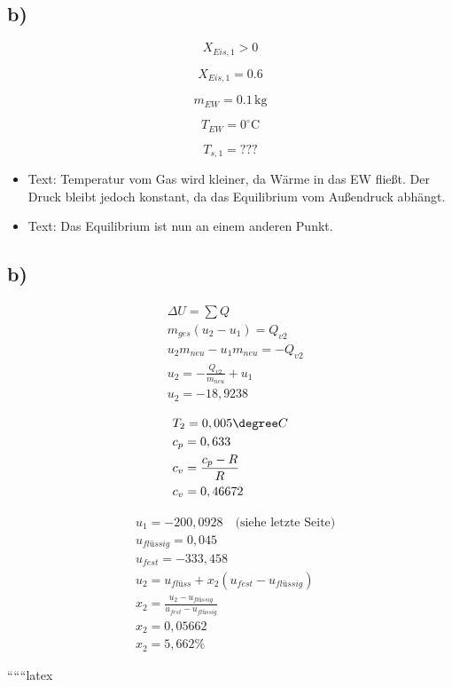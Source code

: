 

\subsection*{b)}

\[
X_{Eis,1} > 0
\]

\[
X_{Eis,1} = 0.6
\]

\[
m_{EW} = 0.1 \, \text{kg}
\]

\[
T_{EW} = 0^\circ \text{C}
\]

\[
T_{s,1} = ???
\]

\begin{itemize}
    \item Text: Temperatur vom Gas wird kleiner, da Wärme in das EW fließt. Der Druck bleibt jedoch konstant, da das Equilibrium vom Außendruck abhängt.
    \item Text: Das Equilibrium ist nun an einem anderen Punkt.
\end{itemize}



\subsection*{b)}
\begin{align*}
    &\Delta U = \sum Q \\
    &m_{ges} (u_2 - u_1) = Q_{v2} \\
    &u_2 m_{neu} - u_1 m_{neu} = -Q_{v2} \\
    &u_2 = -\frac{Q_{v2}}{m_{neu}} + u_1 \\
    &u_2 = -18,9238
\end{align*}

\begin{align*}
    &T_2 = 0,005 \degree C \\
    &c_p = 0,633 \\
    &c_v = \frac{c_p - R}{R} \\
    &c_v = 0,46672
\end{align*}

\begin{align*}
    &u_1 = -200,0928 \quad \text{(siehe letzte Seite)} \\
    &u_{flüssig} = 0,045 \\
    &u_{fest} = -333,458 \\
    &u_2 = u_{flüss} + x_2 (u_{fest} - u_{flüssig}) \\
    &x_2 = \frac{u_2 - u_{flüssig}}{u_{fest} - u_{flüssig}} \\
    &x_2 = 0,05662 \\
    &x_2 = 5,662 \%
\end{align*}

``````latex